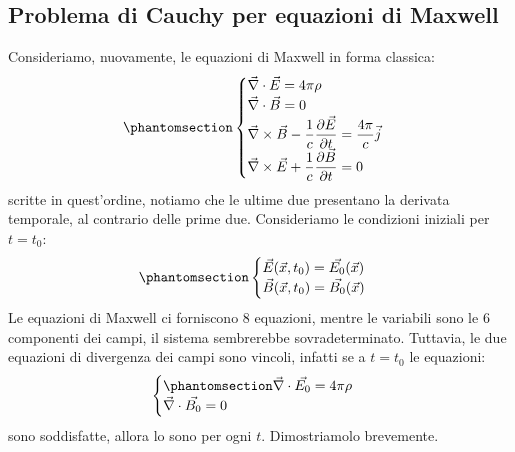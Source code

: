 \subsection{Problema di Cauchy per equazioni di Maxwell}\label{sec:2.5}
Consideriamo, nuovamente, le equazioni di Maxwell in forma classica:
\begin{equation}\phantomsection\label{eq:eq_max_1}
\begin{cases}
  \Vec{\nabla}\cdot\Vec{E}=4\pi\rho\\ 
    \Vec{\nabla}\cdot\Vec{B}=0 \\
     \Vec{\nabla}\times\Vec{B}-\dfrac{1}{c}\dfrac{\partial\Vec{E}}{\partial t}=\dfrac{4\pi}{c}\Vec{j}
    \\
  \Vec{\nabla}\times\Vec{E}+\dfrac{1}{c}\dfrac{\partial\Vec{B}}{\partial t} =0
\end{cases}
\end{equation}
scritte in quest'ordine, notiamo che le ultime due presentano la derivata temporale, al contrario delle prime due.
Consideriamo le condizioni iniziali per $t=t_0$:\begin{equation}\phantomsection\label{eq:cond_ini_campi}
\begin{cases}
  \Vec{E}(\Vec{x},t_0)=\Vec{E_0}(\Vec{x})\\
  \Vec{B}(\Vec{x},t_0)=\Vec{B_0}(\Vec{x})
\end{cases}
\end{equation}
Le equazioni di Maxwell ci forniscono 8 equazioni, mentre le variabili sono le 6 componenti dei campi, il sistema sembrerebbe sovradeterminato. Tuttavia, le due equazioni di divergenza dei campi sono vincoli, infatti se a $t=t_0$ le equazioni:
\begin{equation}
\begin{cases}\phantomsection\label{eq:div_cond_ini}
  \Vec{\nabla}\cdot\Vec{E_0}=4\pi\rho\\ 
    \Vec{\nabla}\cdot\Vec{B_0}=0 \\
\end{cases}
\end{equation}
sono  soddisfatte, allora lo sono per ogni $t$. Dimostriamolo brevemente.
